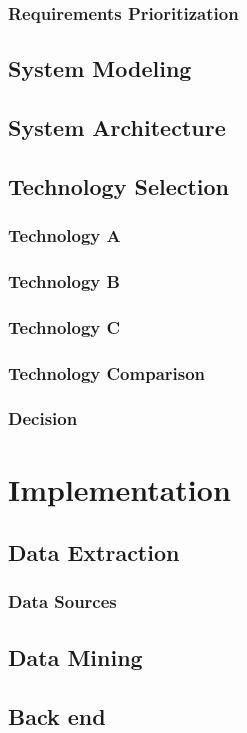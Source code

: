 \documentclass[
  oneside,
  11pt, a4paper,
  footinclude=true,
  headinclude=true,
  cleardoublepage=empty
]{scrbook}
\begin{document}
	\subsection{Requirements Prioritization}
	\section{System Modeling}
	\section{System Architecture}
	\section{Technology Selection}
	\subsection{Technology A}
	\subsection{Technology B}
	\subsection{Technology C}
	\subsection{Technology Comparison}
	\subsection{Decision}
	
	
	\chapter{Implementation}
	\section{Data Extraction}
	\subsection{Data Sources} %
	\section{Data Mining}
	\section{Back end}
\end{document}
